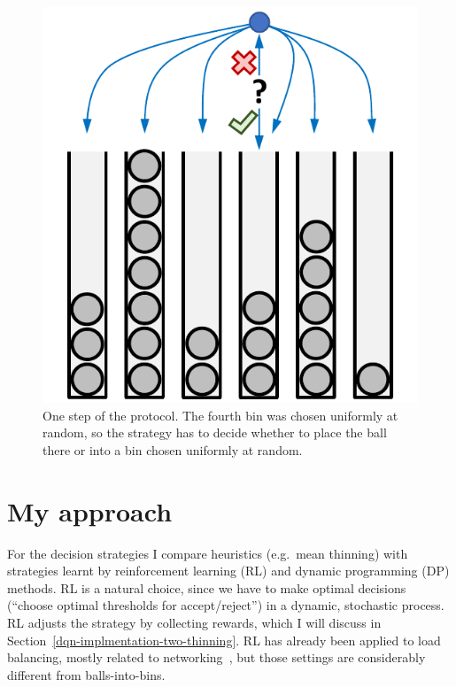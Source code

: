\begin{figure}
    \centering
    \includegraphics{Chapter1/Figs/two_thinning_intro.pdf}
    \caption{One step of the \TwoThinning protocol. The fourth bin was chosen uniformly at random, so the strategy has to decide whether to place the ball there or into a bin chosen uniformly at random.}
    \label{two-thinning-intro}
\end{figure}



\section{My approach}
For the decision strategies I compare heuristics (e.g.\ mean thinning) with strategies learnt by reinforcement learning (RL) and dynamic programming (DP) methods. RL is a natural choice, since we have to make optimal decisions (``choose optimal thresholds for accept/reject'') in a dynamic, stochastic process. RL adjusts the strategy by collecting rewards, which I will discuss in Section~\ref{dqn-implmentation-two-thinning}. RL has already been applied to load balancing, mostly related to networking~\cite{attiah2020RLcellular, yeo2021controller}, but those settings are considerably different from balls-into-bins.


